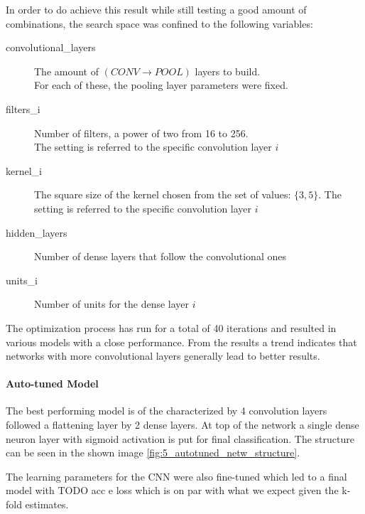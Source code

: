 In order to do achieve this result while still testing a good amount of combinations, the search space
was confined to the following variables:
\begin{description}
    \item [convolutional\_layers] The amount of $(CONV \rightarrow POOL)$ layers to build.\\
    For each of these, the pooling layer parameters were fixed.
    \item[filters\_i] Number of filters, a power of two from 16 to 256.\\
    The setting is referred to the specific convolution layer $i$
    \item[kernel\_i] The square size of the kernel chosen from the set of values: $\{3,5\}$.
    The setting is referred to the specific convolution layer $i$
    \item[hidden\_layers] Number of dense layers that follow the convolutional ones
    \item[units\_i] Number of units for the dense layer $i$
\end{description}

The optimization process has run for a total of 40 iterations and resulted in various models with a close performance.
From the results a trend indicates that networks with more convolutional layers generally lead to better results.

\paragraph{Auto-tuned Model}

The best performing model is of the characterized by 4 convolution layers followed a flattening layer by 2 dense layers.
At top of the network a single dense neuron layer with sigmoid activation is put for final classification.
The structure can be seen in the shown image \ref{fig:5_autotuned_netw_structure}.

The learning parameters for the CNN were also fine-tuned which led to a final model with TODO acc e loss
which is on par with what we expect given the k-fold estimates.

